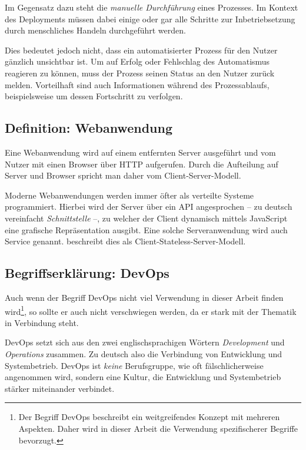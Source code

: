 Im Gegensatz dazu steht die \emph{manuelle Durchführung} eines Prozesses. Im Kontext des Deployments müssen dabei einige oder gar alle Schritte zur Inbetriebsetzung durch menschliches Handeln durchgeführt werden.

Dies bedeutet jedoch nicht, dass ein automatisierter Prozess für den Nutzer gänzlich unsichtbar ist. Um auf Erfolg oder Fehlschlag des Automatismus reagieren zu können, muss der Prozess seinen Status an den Nutzer zurück melden. Vorteilhaft sind auch Informationen während des Prozessablaufs, beispielsweise um dessen Fortschritt zu verfolgen. \citep[10f]{Duvall2007}

\subsection{Definition: Webanwendung}

Eine Webanwendung wird auf einem entfernten Server ausgeführt und vom Nutzer mit einen Browser über \ac{HTTP} aufgerufen. Durch die Aufteilung auf Server und Browser spricht man daher vom Client-Server-Modell.

Moderne Webanwendungen werden immer öfter als verteilte Systeme programmiert. Hierbei wird der Server über ein \ac{API} angesprochen – zu deutsch vereinfacht \emph{Schnittstelle} –, zu welcher der Client dynamisch mittels JavaScript eine grafische Repräsentation ausgibt. Eine solche Serveranwendung wird auch Service genannt. \citep[Kapitel 5.1.3]{Fielding} beschreibt dies als Client-Stateless-Server-Modell.

\subsection{Begriffserklärung: DevOps}
\label{subsec:devops}

Auch wenn der Begriff DevOps nicht viel Verwendung in dieser Arbeit finden wird\footnote{Der Begriff DevOps beschreibt ein weitgreifendes Konzept mit mehreren Aspekten. Daher wird in dieser Arbeit die Verwendung spezifischerer Begriffe bevorzugt.}, so sollte er auch nicht verschwiegen werden, da er stark mit der Thematik in Verbindung steht.

DevOps setzt sich aus den zwei englischsprachigen Wörtern \emph{Development} und \emph{Operations} zusammen. Zu deutsch also die Verbindung von Entwicklung und Systembetrieb. DevOps ist \emph{keine} Berufsgruppe, wie oft fälschlicherweise angenommen wird, sondern eine Kultur, die Entwicklung und Systembetrieb stärker miteinander verbindet.

